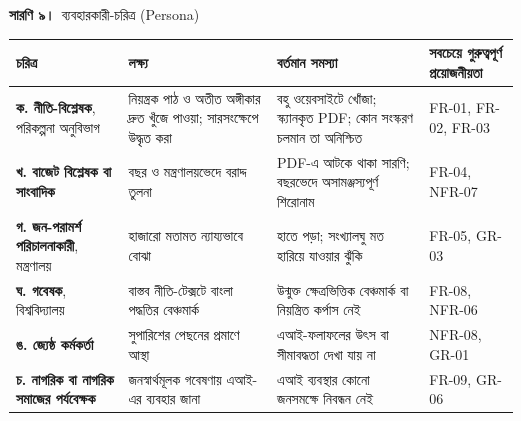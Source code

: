 \documentclass[border=10pt]{standalone}
\begin{document}
\begin{minipage}{17cm}
{\large\bfseries সারণি ৯।}\ {\large ব্যবহারকারী-চরিত্র (Persona)}\par\vspace{7pt}
\small
{}
\begin{tabularx}{\linewidth}{@{}>{\hsize=0.840\hsize\raggedright\arraybackslash}X>{\hsize=0.988\hsize\raggedright\arraybackslash}X>{\hsize=1.185\hsize\raggedright\arraybackslash}X>{\hsize=0.988\hsize\raggedright\arraybackslash}X@{}}
\arrayrulecolor{bapilrule}\toprule
\rowcolor{white}\textbf{চরিত্র} & \textbf{লক্ষ্য} & \textbf{বর্তমান সমস্যা} & \textbf{সবচেয়ে গুরুত্বপূর্ণ প্রয়োজনীয়তা} \\
\midrule
\textbf{ক. নীতি-বিশ্লেষক}, পরিকল্পনা অনুবিভাগ & নিয়ন্ত্রক পাঠ ও অতীত অঙ্গীকার দ্রুত খুঁজে পাওয়া; সারসংক্ষেপে উদ্ধৃত করা & বহু ওয়েবসাইটে খোঁজা; স্ক্যানকৃত PDF; কোন সংস্করণ চলমান তা অনিশ্চিত & FR-01, FR-02, FR-03 \\
\textbf{খ. বাজেট বিশ্লেষক বা সাংবাদিক} & বছর ও মন্ত্রণালয়ভেদে বরাদ্দ তুলনা & PDF-এ আটকে থাকা সারণি; বছরভেদে অসামঞ্জস্যপূর্ণ শিরোনাম & FR-04, NFR-07 \\
\textbf{গ. জন-পরামর্শ পরিচালনাকারী}, মন্ত্রণালয় & হাজারো মতামত ন্যায্যভাবে বোঝা & হাতে পড়া; সংখ্যালঘু মত হারিয়ে যাওয়ার ঝুঁকি & FR-05, GR-03 \\
\textbf{ঘ. গবেষক}, বিশ্ববিদ্যালয় & বাস্তব নীতি-টেক্সটে বাংলা পদ্ধতির বেঞ্চমার্ক & উন্মুক্ত ক্ষেত্রভিত্তিক বেঞ্চমার্ক বা নিয়ন্ত্রিত কর্পাস নেই & FR-08, NFR-06 \\
\textbf{ঙ. জ্যেষ্ঠ কর্মকর্তা} & সুপারিশের পেছনের প্রমাণে আস্থা & এআই-ফলাফলের উৎস বা সীমাবদ্ধতা দেখা যায় না & NFR-08, GR-01 \\
\textbf{চ. নাগরিক বা নাগরিক সমাজের পর্যবেক্ষক} & জনস্বার্থমূলক গবেষণায় এআই-এর ব্যবহার জানা & এআই ব্যবস্থার কোনো জনসমক্ষে নিবন্ধন নেই & FR-09, GR-06 \\
\bottomrule
\end{tabularx}
\par{}
\end{minipage}
\end{document}

